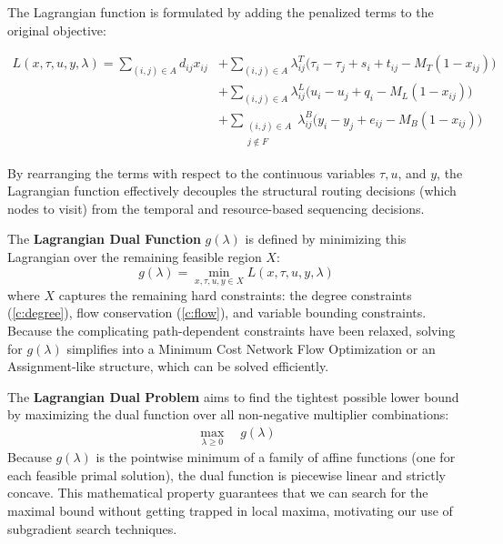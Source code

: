 \documentclass[11pt]{article}
\begin{document}
The Lagrangian function is formulated by adding the penalized terms to the original objective:
\begin{footnotesize}
\begin{align*}
    L(x, \tau, u, y, \lambda) = \sum_{(i,j) \in A} d_{ij} x_{ij} 
    &+ \sum_{(i,j) \in A} \lambda^T_{ij} \Big(\tau_i - \tau_j + s_i + t_{ij} - M_T(1 - x_{ij})\Big) \\
    &+ \sum_{(i,j) \in A} \lambda^L_{ij} \Big(u_i - u_j + q_i - M_L(1 - x_{ij})\Big) \\
    &+ \sum_{\substack{(i,j) \in A \\ j \notin F}} \lambda^B_{ij} \Big(y_i - y_j + e_{ij} - M_B(1 - x_{ij})\Big)
\end{align*}
\end{footnotesize}

By rearranging the terms with respect to the continuous variables $\tau, u$, and $y$, the Lagrangian function effectively decouples the structural routing decisions (which nodes to visit) from the temporal and resource-based sequencing decisions.

The \textbf{Lagrangian Dual Function} $g(\lambda)$ is defined by minimizing this Lagrangian over the remaining feasible region $X$:
\[ g(\lambda) = \min_{x, \tau, u, y \in X} L(x, \tau, u, y, \lambda) \]
where $X$ captures the remaining hard constraints: the degree constraints (\ref{c:degree}), flow conservation (\ref{c:flow}), and variable bounding constraints. Because the complicating path-dependent constraints have been relaxed, solving for $g(\lambda)$ simplifies into a Minimum Cost Network Flow Optimization or an Assignment-like structure, which can be solved efficiently.

The \textbf{Lagrangian Dual Problem} aims to find the tightest possible lower bound by maximizing the dual function over all non-negative multiplier combinations:
\begin{align}
    \max_{\lambda \ge 0} \quad g(\lambda)
\end{align}
Because $g(\lambda)$ is the pointwise minimum of a family of affine functions (one for each feasible primal solution), the dual function is piecewise linear and strictly concave. This mathematical property guarantees that we can search for the maximal bound without getting trapped in local maxima, motivating our use of subgradient search techniques.
\end{document}
